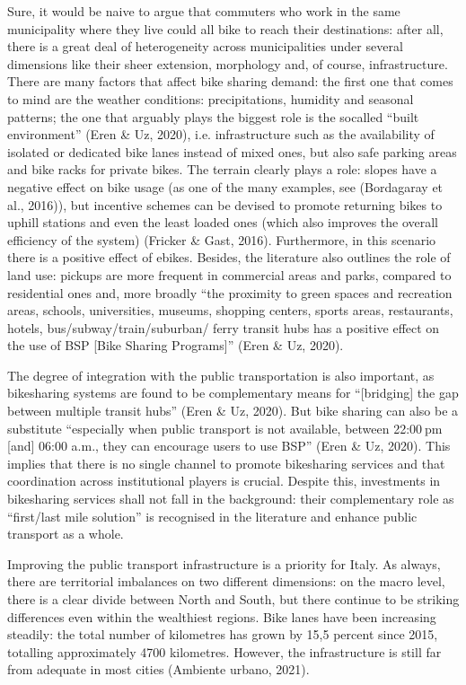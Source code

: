 \documentclass[letterpaper,10pt,english]{jupyterBook}
\begin{document}
\sphinxAtStartPar
Sure, it would be naive to argue that commuters who work in the same municipality where they live could all bike to reach their destinations: after all, there is a great deal of heterogeneity across municipalities under several dimensions \sphinxhyphen{} like their sheer extension, morphology and, of course, infrastructure. There are many factors that affect bike sharing demand: the first one that comes to mind are the weather conditions: precipitations, humidity and seasonal patterns; the one that arguably plays the biggest role is the so\sphinxhyphen{}called “built environment” (Eren \& Uz, 2020), i.e. infrastructure such as the availability of isolated or dedicated bike lanes instead of mixed ones, but also safe parking areas and bike racks for private bikes. The terrain clearly plays a role: slopes have a negative effect on bike usage (as one of the many examples, see (Bordagaray et al., 2016)), but incentive schemes can be devised to promote returning bikes to up\sphinxhyphen{}hill stations and even the least loaded ones (which also improves the overall efficiency of the system) (Fricker \& Gast, 2016). Furthermore, in this scenario there is a positive effect of e\sphinxhyphen{}bikes. Besides, the literature also outlines the role of land use: pick\sphinxhyphen{}ups are more frequent in commercial areas and parks, compared to residential ones and, more broadly “the proximity to green spaces and recreation areas, schools, universities, museums, shopping centers, sports areas, restaurants, hotels, bus/subway/train/suburban/ ferry transit hubs has a positive effect on the use of BSP {[}Bike Sharing Programs{]}” (Eren \& Uz, 2020).

\sphinxAtStartPar
The degree of integration with the public transportation is also important, as bike\sphinxhyphen{}sharing systems are found to be complementary means for “{[}bridging{]} the gap between multiple transit hubs” (Eren \& Uz, 2020). But bike sharing can also be a substitute “especially when public transport is not available, between 22:00 pm {[}and{]} 06:00 a.m., they can encourage users to use BSP” (Eren \& Uz, 2020). This implies that there is no single channel to promote bike\sphinxhyphen{}sharing services and that coordination across institutional players is crucial. Despite this, investments in bike\sphinxhyphen{}sharing services shall not fall in the background: their complementary role as “first/last mile solution” is recognised in the literature and enhance public transport as a whole.

\sphinxAtStartPar
Improving the public transport infrastructure is a priority for Italy. As always, there are territorial imbalances on two different dimensions: on the macro level, there is a clear divide between North and South, but there continue to be striking differences even within the wealthiest regions. Bike lanes have been increasing steadily: the total number of kilometres has grown by 15,5 percent since 2015, totalling approximately 4700 kilometres. However, the infrastructure is still far from adequate in most cities (Ambiente urbano, 2021).
\end{document}
